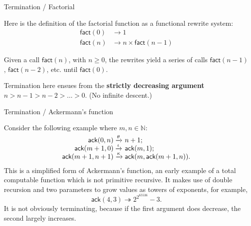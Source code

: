 \documentclass[compress,dvipdfmx]{beamer}
\newcommand\fun[1]{\textsf{#1}}
\newcommand\smashedrightarrow[1]{\xrightarrow{\smash{#1}}}
\begin{document}
%
\begin{frame}{Termination / Factorial}

  Here is the definition of the factorial function as a functional
  rewrite system:
  \begin{align*}
    \fun{fact}(0) & \rightarrow 1\\
    \fun{fact}(n) & \rightarrow n \times \fun{fact}(n-1)
  \end{align*}

  \medskip

  Given a call \(\fun{fact}(n)\), with \(n \geqslant 0\), the rewrites
  yield a series of calls \(\fun{fact}(n-1)\), \(\fun{fact}(n-2)\),
  etc. until \(\fun{fact}(0)\).

  \bigskip

  Termination here ensues from the \textbf{strictly decreasing
    argument} \(n > n-1 > n-2 > \dots > 0\). (No infinite descent.)

\end{frame}

%
\begin{frame}{Termination / Ackermann's function}

Consider the following example where \(m,n \in \mathbb{N}\):
\begin{equation*}
\begin{array}{@{}r@{\;}l@{\;}l@{}}
\fun{ack}(0,n)     & \smashedrightarrow{\theta} & n+1;\\
\fun{ack}(m+1,0)   & \smashedrightarrow{\iota} & \fun{ack}(m,1);\\
\fun{ack}(m+1,n+1) & \smashedrightarrow{\kappa}
                   & \fun{ack}(m,\fun{ack}(m+1,n)).
\end{array}
\end{equation*}
This is a simplified form of Ackermann's function, an early example of
a total computable function which is not primitive recursive. It makes
use of double recursion and two parameters to grow values as towers of
exponents, for example,
\begin{equation*}
  \fun{ack}(4,3) \twoheadrightarrow 2^{2^{65536}} - 3.
\end{equation*}
It is not obviously terminating, because if the first argument does
decrease, the second largely increases.

\end{frame}
\end{document}
